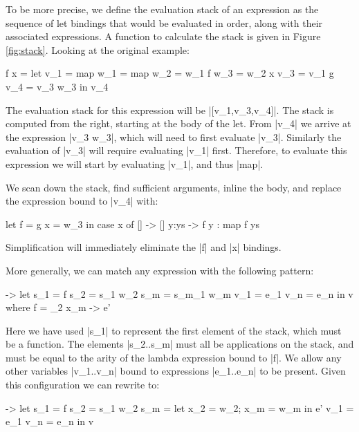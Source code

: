 \documentclass[draft]{sigplanconf}
\begin{document}
To be more precise, we define the evaluation stack of an expression as the sequence of let bindings that would be evaluated in order, along with their associated expressions. A function to calculate the stack is given in Figure \ref{fig:stack}. Looking at the original example:

\begin{code}
\g f x =  let  v_1  = map
               w_1  = map
               w_2  = w_1 f
               w_3  = w_2 x
               v_3  = v_1 g
               v_4  = v_3 w_3
          in   v_4
\end{code}

The evaluation stack for this expression will be |[v_1,v_3,v_4]|. The stack is computed from the right, starting at the body of the let. From |v_4| we arrive at the expression |v_3 w_3|, which will need to first evaluate |v_3|. Similarly the evaluation of |v_3| will require evaluating |v_1| first. Therefore, to evaluate this expression we will start by evaluating |v_1|, and thus |map|.

We scan down the stack, find sufficient arguments, inline the body, and replace the expression bound to |v_4| with:

\begin{code}
let  f  = g
     x  = w_3
in   case  x of
           []    -> []
           y:ys  -> f y : map f ys
\end{code}

Simplification will immediately eliminate the |f| and |x| bindings.

More generally, we can match any expression with the following pattern:

\begin{code}
\free ->  let  s_1  = f
               s_2  = s_1 w_2
               s_m  = s_m_1 w_m
               v_1  = e_1
               v_n  = e_n
          in   v
where f = \x_2 x_m -> e'
\end{code}

Here we have used |s_1| to represent the first element of the stack, which must be a function. The elements |s_2..s_m| must all be applications on the stack, and must be equal to the arity of the lambda expression bound to |f|. We allow any other variables |v_1..v_n| bound to expressions |e_1..e_n| to be present. Given this configuration we can rewrite to:

\begin{code}
\free ->  let  s_1  = f
               s_2  = s_1 w_2
               s_m  = let x_2 = w_2; x_m = w_m in e'
               v_1  = e_1
               v_n  = e_n
          in   v
\end{code}
\end{document}

